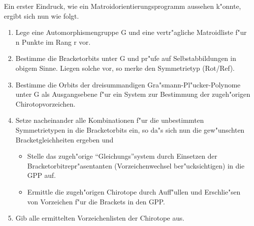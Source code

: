 Ein erster Eindruck, wie ein Matroidorientierungsprogramm aussehen k"onnte,
ergibt sich nun wie folgt.
\begin{enumerate}
\item Lege eine Automorphismengruppe G und eine vertr"agliche Matroidliste
      f"ur n Punkte im Rang r vor.
\item Bestimme die Bracketorbits unter G und pr"ufe auf Selbstabbildungen in
      obigem Sinne. Liegen solche vor, so merke den Symmetrietyp (Rot/Ref).
\item Bestimme die Orbits der dreisummandigen Gra"smann-Pl"ucker-Polynome
      unter G als Ausgangsebene f"ur ein System zur Bestimmung der zugeh"origen
      Chirotopvorzeichen.
\item Setze nacheinander alle Kombinationen f"ur die unbestimmten Symmetrietypen
      in die Bracketorbits ein, so da"s sich nun die gew"unschten
      Bracketgleichheiten ergeben und
\begin{itemize}
\item Stelle das zugeh"orige "`Gleichungs"'system durch Einsetzen der
      Bracket\-orbitrepr"asentanten (Vorzeichenwechsel ber"ucksichtigen)
      in die GPP auf.
\item Ermittle die zugeh"origen Chirotope durch Auff"ullen und Erschlie"sen von
      Vorzeichen f"ur die Brackets in den GPP.
\end{itemize}
\item Gib alle ermittelten Vorzeichenlisten der Chirotope aus.
\end{enumerate}

